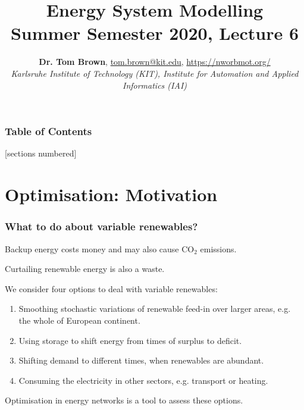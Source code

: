 \documentclass[10pt,aspectratio=169,dvipsnames]{beamer}
\title{Energy System Modelling\\ Summer Semester 2020, Lecture 6}
\author{
  {\bf Dr. Tom Brown}, \href{mailto:tom.brown@kit.edu}{tom.brown@kit.edu}, \url{https://nworbmot.org/}\\
  \emph{Karlsruhe Institute of Technology (KIT), Institute for Automation and Applied Informatics (IAI)}
}
\date{}
\let\olditem\item
\renewcommand{\item}{%
\olditem\vspace{5pt}}
\begin{document}
\maketitle


\begin{frame}

  \frametitle{Table of Contents}
  [sections numbered]
  \tableofcontents[hideallsubsections]
\end{frame}


\section{Optimisation: Motivation}



\begin{frame}
  \frametitle{What to do about variable renewables?}

  Backup energy costs money and may also cause CO${}_2$ emissions.

  Curtailing renewable energy is also a waste.

  We consider \alert{four options} to deal with variable renewables:
  \begin{enumerate}
  \item Smoothing stochastic variations of renewable feed-in over \alert{larger areas}, e.g. the whole of European continent.
  \item Using \alert{storage} to shift energy from times of surplus to deficit.
  \item \alert{Shifting demand} to different times, when renewables are abundant.
    \item Consuming the electricity in \alert{other sectors}, e.g. transport or heating.
  \end{enumerate}

\alert{Optimisation} in energy networks is a tool to assess these options.


\end{frame}
\end{document}
